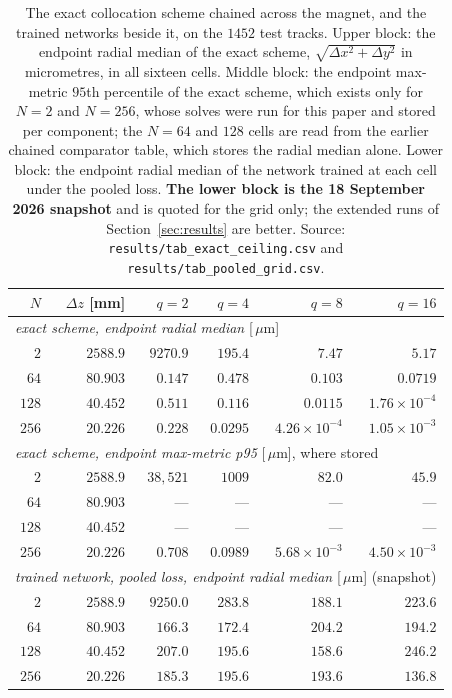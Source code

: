 \documentclass[11pt,a4paper]{article}
\newcommand{\um}{\ensuremath{\,\mu\mathrm{m}}}
\begin{document}
\begin{table}[tbp]
  \centering
  \caption{The exact collocation scheme chained across the magnet, and the
  trained networks beside it, on the $1452$ test tracks. Upper block: the
  endpoint radial median of the exact scheme, $\sqrt{\Delta x^2 + \Delta y^2}$
  in micrometres, in all sixteen cells. Middle block: the endpoint max-metric
  $95$th percentile of the exact scheme, which exists only for $N = 2$ and
  $N = 256$, whose solves were run for this paper and stored per component; the
  $N = 64$ and $128$ cells are read from the earlier chained comparator table,
  which stores the radial median alone. Lower block: the endpoint radial median
  of the network trained at each cell under the pooled loss. \textbf{The lower
  block is the 18 September 2026 snapshot} and is quoted for the grid only; the
  extended runs of Section~\ref{sec:results} are better.
  Source: \texttt{results/tab\_exact\_ceiling.csv} and
  \texttt{results/tab\_pooled\_grid.csv}.}
  \label{tab:ceiling}
  \small
  \setlength{\tabcolsep}{6pt}
  \begin{tabular}{rrrrrr}
    \toprule
    $N$ & $\Delta z$ [mm] & $q = 2$ & $q = 4$ & $q = 8$ & $q = 16$ \\
    \midrule
    \multicolumn{6}{l}{\emph{exact scheme, endpoint radial median} [\um]} \\
    $2$   & $2588.9$  & $9270.9$ & $195.4$   & $7.47$    & $5.17$ \\
    $64$  & $80.903$  & $0.147$  & $0.478$   & $0.103$   & $0.0719$ \\
    $128$ & $40.452$  & $0.511$  & $0.116$   & $0.0115$  & $1.76\times 10^{-4}$ \\
    $256$ & $20.226$  & $0.228$  & $0.0295$  & $4.26\times 10^{-4}$ & $1.05\times 10^{-3}$ \\
    \midrule
    \multicolumn{6}{l}{\emph{exact scheme, endpoint max-metric p95} [\um], where stored} \\
    $2$   & $2588.9$  & $38{,}521$ & $1009$ & $82.0$ & $45.9$ \\
    $64$  & $80.903$  & ---        & ---    & ---    & --- \\
    $128$ & $40.452$  & ---        & ---    & ---    & --- \\
    $256$ & $20.226$  & $0.708$    & $0.0989$ & $5.68\times 10^{-3}$ & $4.50\times 10^{-3}$ \\
    \midrule
    \multicolumn{6}{l}{\emph{trained network, pooled loss, endpoint radial median} [\um] (snapshot)} \\
    $2$   & $2588.9$  & $9250.0$ & $283.8$ & $188.1$ & $223.6$ \\
    $64$  & $80.903$  & $166.3$  & $172.4$ & $204.2$ & $194.2$ \\
    $128$ & $40.452$  & $207.0$  & $195.6$ & $158.6$ & $246.2$ \\
    $256$ & $20.226$  & $185.3$  & $195.6$ & $193.6$ & $136.8$ \\
    \bottomrule
  \end{tabular}
\end{table}
\end{document}
